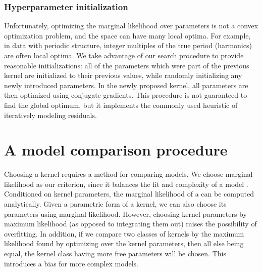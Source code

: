 



\subsubsection{Hyperparameter initialization}

Unfortunately, optimizing the marginal likelihood over parameters is not a convex optimization problem, and the space can have many local optima.
For example, in data with periodic structure, integer multiples of the true period (harmonics) are often local optima. 
We take advantage of our search procedure to provide reasonable initializations: all of the parameters which were part of the previous kernel are initialized to their previous values, while randomly initializing any newly introduced parameters.
In the newly proposed kernel, all parameters are then optimized using conjugate gradients.
This procedure is not guaranteed to find the global optimum, but it implements the commonly used heuristic of iteratively modeling residuals.






\section{A model comparison procedure}

Choosing a kernel requires a method for comparing models.
We choose marginal likelihood as our criterion, since it balances the fit and complexity of a model \citep{rasmussen2001occam}.
Conditioned on kernel parameters, the marginal likelihood of a \gp{} can be computed analytically.
Given a parametric form of a kernel, we can also choose its parameters using marginal likelihood.
However, choosing kernel parameters by maximum likelihood (as opposed to integrating them out) raises the possibility of overfitting.
In addition, if we compare two classes of kernels by the maximum likelihood found by optimizing over the kernel parameters, then all else being equal, the kernel class having more free parameters will be chosen.
This introduces a bias for more complex models.

